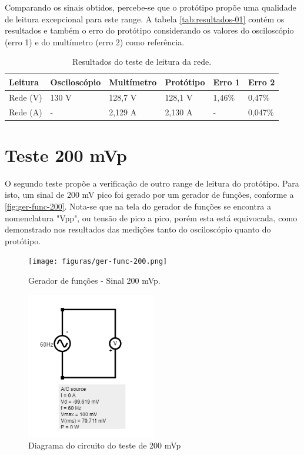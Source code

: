 Comparando os sinais obtidos, percebe-se que o protótipo propõe uma qualidade de leitura excepcional para este range. A tabela \autoref{tab:resultados-01} contém os resultados e também o erro do protótipo considerando os valores do osciloscópio (erro 1) e do multímetro (erro 2) como referência.

\begin{table}[!ht]
    \centering
    \caption{Resultados do teste de leitura da rede.}
    \label{tab:resultados-01}
    \begin{tabular}{|l|l|l|l|l|l|}
        \hline
        \textbf{Leitura} & \textbf{Osciloscópio} & \textbf{Multímetro} & \textbf{Protótipo}  & \textbf{Erro 1}  & \textbf{Erro 2}  \\ \hline
        Rede (V)         & 130 V                 & 128,7 V             & 128,1 V             & 1,46\%           & 0,47\%           \\ \hline
        Rede (A)         & -                     & 2,129 A             & 2,130 A             & -                & 0,047\%          \\ \hline
    \end{tabular}
    \fonte{}
\end{table}



\section{Teste 200 mVp}\label{teste-200mv}

O segundo teste propõe a verificação de outro range de leitura do protótipo. Para isto, um sinal de 200 mV pico foi gerado por um gerador de funções, conforme a \autoref{fig:ger-func-200}. Nota-se que na tela do gerador de funções se encontra a nomenclatura "Vpp", ou tensão de pico a pico, porém esta está equivocada, como demonstrado nos resultados das medições tanto do osciloscópio quanto do protótipo.

\begin{figure}[htb!]
    \caption{Gerador de funções - Sinal 200 mVp.}
    \label{fig:ger-func-200}
    \texttt{[image: figuras/ger-func-200.png]}
    \fonte{}
\end{figure}

\begin{figure}[htb!]
    \caption{Diagrama do circuito do teste de 200 mVp}
    \label{fig:circ-200}
    \includegraphics[width=0.5\textwidth]{figuras/circ-200-falstad.png}
    \fonte{}
\end{figure}

